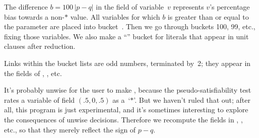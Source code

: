 The difference $b=100\,\vert p-q\vert$ in the field of
variable~$v$
represents $v$'s percentage bias
towards a non-$*$ value. All variables for which $b$ is greater than
or equal to the  parameter are placed into bucket~.
Then we go through buckets 100, 99, etc., fixing those variables.
We also make a ``'' bucket for literals that appear in unit
clauses after reduction.

Links within the bucket lists are odd numbers, terminated by~2; they
appear in the  fields of , , etc.

It's probably unwise for the user to make , because
the pseudo-satisfiability test rates a variable of field $(.5,0,.5)$
as a~`$*$'. But we haven't ruled that out; after all, this program
is just experimental, and it's sometimes interesting to explore the
consequences of unwise decisions. Therefore we recompute the
 fields in , , etc., so
that they
merely reflect the sign of $p-q$.

